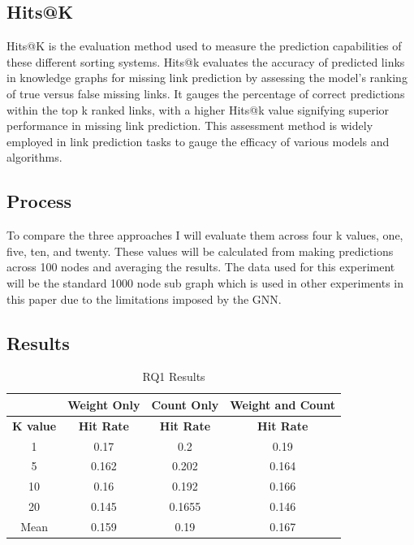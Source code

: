 \documentclass{l4proj}
\begin{document}
\subsection{Hits@K}

Hits@K is the evaluation method used to measure the prediction capabilities of these different sorting systems. Hits@k evaluates the accuracy of predicted links in knowledge graphs for missing link prediction by assessing the model's ranking of true versus false missing links. It gauges the percentage of correct predictions within the top k ranked links, with a higher Hits@k value signifying superior performance in missing link prediction. This assessment method is widely employed in link prediction tasks to gauge the efficacy of various models and algorithms. \\

\subsection{Process}

To compare the three approaches I will evaluate them across four k values, one, five, ten, and twenty. These values will be calculated from making predictions across 100 nodes and averaging the results. The data used for this experiment will be the standard 1000 node sub graph which is used in other experiments in this paper due to the limitations imposed by the GNN.\\

\subsection{Results}

\begin{table}[h]
    \centering
    \caption{RQ1 Results}
    \label{tab:rq1_results}
    \begin{tabular}{|c|c|c|c|}
    \hline
    & \textbf{Weight Only} & \textbf{Count Only} &\textbf{Weight and Count} \\ \hline
    \textbf{K value} & \textbf{Hit Rate} & \textbf{Hit Rate} & \textbf{Hit Rate}\\ \hline
    1 & 0.17 & 0.2 & 0.19 \\ \hline
    5 & 0.162 & 0.202 & 0.164\\ \hline
    10 & 0.16 & 0.192 & 0.166 \\ \hline
    20 & 0.145 &0.1655 & 0.146\\ \hline
    Mean & 0.159 & 0.19 & 0.167 \\ \hline
    \end{tabular}
\end{table}
\end{document}
